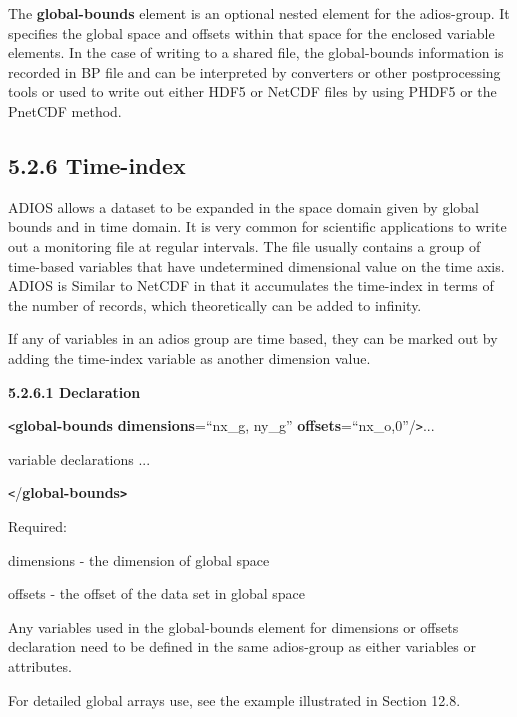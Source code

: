 \leftskip=0pt
\parindent=0pt
The \textbf{global-bounds} element is an optional nested element for the adios-group. 
It specifies the global space and offsets within that space for the enclosed variable 
elements. In the case of writing to a shared file, the global-bounds information 
is recorded in BP file and can be interpreted by converters or other postprocessing 
tools or used to write out either HDF5 or NetCDF files by using PHDF5 or the PnetCDF 
method.\label{HToc84890248}\label{HToc212016624}\label{HToc212016866}\label{HRef278371225}\label{HToc182553371}

\subsection*{{\large \textbf{5.2.6 Time-index}}}

ADIOS allows a dataset to be expanded in the space domain given by global bounds 
and in time domain. It is very common for scientific applications to write out 
a monitoring file at regular intervals. The file usually contains a group of time-based 
variables that have undetermined dimensional value on the time axis. ADIOS is Similar 
to NetCDF in that it accumulates the time-index in terms of the number of records, 
which theoretically can be added to infinity.

If any of variables in an adios group are time based, they can be marked out by 
adding the time-index variable as another dimension value. 

\textbf{5.2.6.1 Declaration}

\texttt{<}\textbf{global-bounds} \textbf{dimensions}=``nx\_g, ny\_g'' \textbf{offsets}=``nx\_o,0''/\texttt{>}...

\parindent=21pt
variable declarations ...

\parindent=0pt
\texttt{<}/\textbf{global-bounds\texttt{>}}

Required:

\leftskip=18pt
\parindent=3pt
dimensions - the dimension of global space

offsets - the offset of the data set in global space

\leftskip=0pt
\parindent=0pt
Any variables used in the global-bounds element for dimensions or offsets declaration 
need to be defined in the same adios-group as either variables or attributes. 

For detailed global arrays use, see the example illustrated in Section 12.8.

